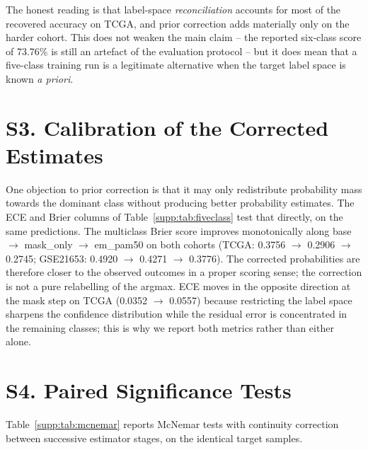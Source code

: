 \documentclass[11pt,a4paper]{article}
\begin{document}
The honest reading is that label-space \emph{reconciliation} accounts for most of the
recovered accuracy on TCGA, and prior correction adds materially only on the harder cohort.
This does not weaken the main claim -- the reported six-class score of 73.76\% is still an
artefact of the evaluation protocol -- but it does mean that a five-class training run is a
legitimate alternative when the target label space is known \emph{a priori}.


\section*{S3. Calibration of the Corrected Estimates}
\label{supp:calibration}

One objection to prior correction is that it may only redistribute probability mass
towards the dominant class without producing better probability estimates. The ECE and
Brier columns of Table~\ref{supp:tab:fiveclass} test that directly, on the same
predictions. The multiclass Brier score improves monotonically along
base $\rightarrow$ mask\_only $\rightarrow$ em\_pam50 on both cohorts
(TCGA: 0.3756 $\rightarrow$ 0.2906 $\rightarrow$ 0.2745; GSE21653: 0.4920 $\rightarrow$ 0.4271
$\rightarrow$ 0.3776). The corrected probabilities are therefore closer to the observed
outcomes in a proper scoring sense; the correction is not a pure relabelling of the
argmax. ECE moves in the opposite direction at the mask step on TCGA (0.0352 $\rightarrow$
0.0557) because restricting the label space sharpens the confidence distribution while the
residual error is concentrated in the remaining classes; this is why we report both
metrics rather than either alone.


\section*{S4. Paired Significance Tests}
\label{supp:significance}

Table~\ref{supp:tab:mcnemar} reports McNemar tests with continuity correction between
successive estimator stages, on the identical target samples.
\end{document}
